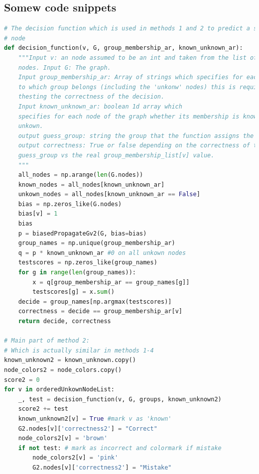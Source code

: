 \documentclass[a4paper,10pt]{article}
\theoremstyle{definition}
\theoremstyle{remark}
\theoremstyle{plain}
\begin{document}
\subsection{Somew code snippets}
\begin{lstlisting}[language=python]
# The decision function which is used in methods 1 and 2 to predict a single
# node
def decision_function(v, G, group_membership_ar, known_unknown_ar):
    """Input v: an node assumed to be an int and taken from the list of unkown
    nodes. Input G: The graph. 
    Input group_membership_ar: Array of strings which specifies for each node 
    to which group belongs (including the 'unkonw' nodes) this is required for
    thesting the correctness of the decision.
    Input known_unknown_ar: boolean 1d array which
    specifies for each node of the graph whether its membership is known or
    unkown. 
    output guess_group: string the group that the function assigns the node to.
    output correctness: True or false depending on the correctness of the
    guess_group vs the real group_membership_list[v] value.
    """
    all_nodes = np.arange(len(G.nodes))
    known_nodes = all_nodes[known_unknown_ar]
    unkown_nodes = all_nodes[known_unknown_ar == False]
    bias = np.zeros_like(G.nodes)
    bias[v] = 1
    bias
    p = biasedPropagateGv2(G, bias=bias)
    group_names = np.unique(group_membership_ar)
    q = p * known_unknown_ar #0 on all unkown nodes
    testscores = np.zeros_like(group_names)
    for g in range(len(group_names)):
        x = q[group_membership_ar == group_names[g]] 
        testscores[g] = x.sum()
    decide = group_names[np.argmax(testscores)]
    correctness = decide == group_membership_ar[v]
    return decide, correctness

# Main part of method 2:
# Which is actually similar in methods 1-4
known_unknown2 = known_unknown.copy()
node_colors2 = node_colors.copy()
score2 = 0
for v in orderedUnkownNodeList:
    _, test = decision_function(v, G, groups, known_unknown2)
    score2 += test
    known_unknown2[v] = True #mark v as 'known'
    G2.nodes[v]['correctness2'] = "Correct"
    node_colors2[v] = 'brown'
    if not test: # mark as incorrect and colormark if mistake
        node_colors2[v] = 'pink'
        G2.nodes[v]['correctness2'] = "Mistake"
\end{lstlisting}

\end{document}
